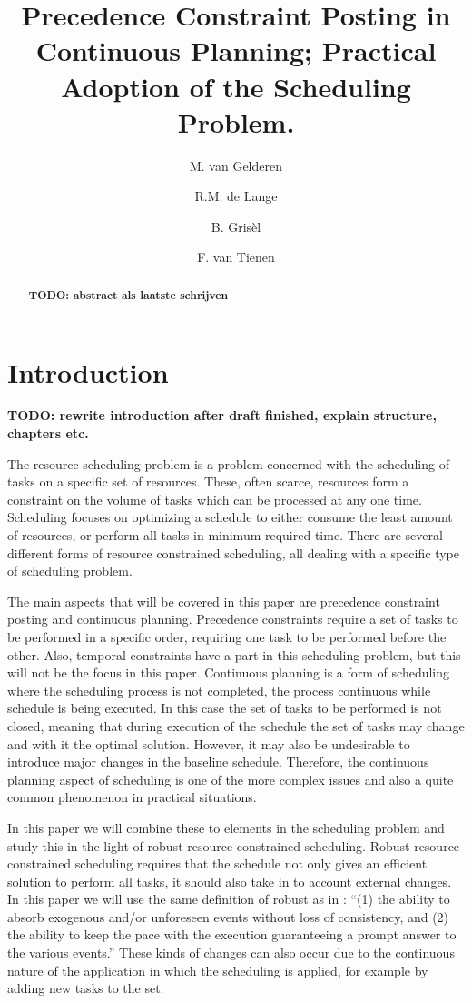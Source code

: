 \documentclass{article}
\title{Precedence Constraint Posting in Continuous Planning; Practical Adoption of the Scheduling Problem.}
\author{M. van Gelderen  \and
    R.M. de Lange \and
    B. Gris\`el \and
    F. van Tienen}
\date{}
\newcommand{\TODO}[1]{{\color{red}\textbf{TODO: #1}}}
\begin{document}
\maketitle
\thispagestyle{empty}

\begin{abstract}
\TODO{abstract als laatste schrijven}
\end{abstract}

\newpage

\section{Introduction}
\TODO{rewrite introduction after draft finished, explain structure, chapters etc.}

The resource scheduling problem is a problem concerned with the scheduling of tasks on a specific set of resources.
These, often scarce, resources form a constraint on the volume of tasks which can be processed at any one time.
Scheduling focuses on optimizing a schedule to either consume the least amount of resources, or perform all tasks in minimum required time.  \cite{brucker99}
There are several different forms of resource constrained scheduling, all dealing with a specific type of scheduling problem.

The main aspects that will be covered in this paper are precedence constraint posting and continuous planning.
Precedence constraints require a set of tasks to be performed in a specific order, requiring one task to be performed before the other.
Also, temporal constraints have a part in this scheduling problem, but this will not be the focus in this paper.
Continuous planning is a form of scheduling where the scheduling process is not completed, the process continuous while schedule is being executed.
In this case the set of tasks to be performed is not closed, meaning that during execution of the schedule the set of tasks may change and with it the optimal solution.
However, it may also be undesirable to introduce major changes in the baseline schedule.
Therefore, the continuous planning aspect of scheduling is one of the more complex issues and also a quite common phenomenon in practical situations.

In this paper we will combine these to elements in the scheduling problem and study this in the light of robust resource constrained scheduling.
Robust resource constrained scheduling requires that the schedule not only gives an efficient solution to perform all tasks, it should also take in to account external changes.
In this paper we will use the same definition of robust as in \cite{policella07} : ``{(1) the ability to absorb exogenous and/or unforeseen events without loss of consistency, and (2) the ability to keep the pace with the execution guaranteeing a prompt answer to the various events.}''
These kinds of changes can also occur due to the continuous nature of the application in which the scheduling is applied, for example by adding new tasks to the set.
\end{document}

